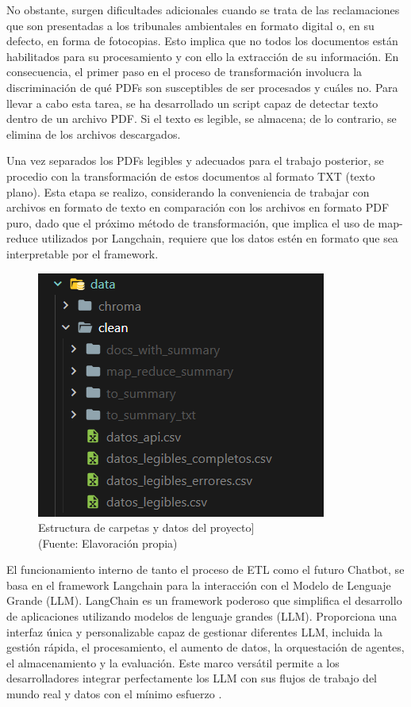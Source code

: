 \par No obstante, surgen dificultades adicionales cuando se trata de las reclamaciones que son presentadas a los tribunales ambientales 
en formato digital o, en su defecto, en forma de fotocopias. Esto implica que no todos los documentos están habilitados para su 
procesamiento y con ello la extracción de su información. En consecuencia, el primer paso en el proceso de transformación involucra la discriminación de qué PDFs son 
susceptibles de ser procesados y cuáles no. Para llevar a cabo esta tarea, se ha desarrollado un script capaz de detectar 
texto dentro de un archivo PDF. Si el texto es legible, se almacena; de lo contrario, se elimina de los archivos descargados.

\par Una vez separados los PDFs legibles y adecuados para el trabajo posterior, se procedio con la transformación de estos documentos 
al formato TXT (texto plano). Esta etapa se realizo, considerando la conveniencia de trabajar con archivos en formato de 
texto en comparación con los archivos en formato PDF puro, dado que el próximo método de transformación, que implica el uso de
map-reduce utilizados por Langchain, requiere que los datos estén en formato que sea interpretable por el framework.

 \begin{figure}[ht!]
    \centering
    \includegraphics[width=.5\textwidth]{figures/huemulFOLDERS.png}
    \caption[Estructura de carpetas y datos del proyecto]{Estructura de carpetas y datos del proyecto]\\
    {\scriptsize (Fuente: Elavoración propia)}}
    \label{fig:chatbot1}
\end{figure}

\newpage

\par El funcionamiento interno de tanto el proceso de ETL como el futuro Chatbot, se basa en el framework Langchain para la interacción con el Modelo de Lenguaje Grande (LLM). 
LangChain es un framework poderoso que simplifica el desarrollo de aplicaciones utilizando modelos de lenguaje grandes (LLM). Proporciona 
una interfaz única y personalizable capaz de gestionar diferentes LLM, incluida la gestión rápida, el procesamiento, el aumento de datos, 
la orquestación de agentes, el almacenamiento y la evaluación. Este marco versátil permite a los desarrolladores integrar perfectamente 
los LLM con sus flujos de trabajo del mundo real y datos con el mínimo esfuerzo \cite{langchain1}.



